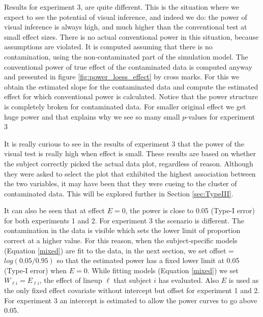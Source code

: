 \documentclass{article}
\begin{document}
Results for experiment 3, are quite different. This is the situation where we expect to see the potential of visual inference, and indeed we do: the power of visual inference is always high, and much higher than the conventional test at small effect sizes. There is no actual conventional power in this situation, because assumptions are violated. It is computed assuming that there is no contamination, using the non-contaminated part of the simulation model. The  conventional power of true effect of the contaminated data is computed anyway and presented in figure \ref{fig:power_loess_effect} by cross marks. For this we obtain the estimated slope for the contaminated data and compute the estimated effect for which conventional power is calculated. Notice that the power structure is completely broken for contaminated data. For smaller original effect we get huge power and that explains why we see so many small $p$-values for experiment 3

It is really curious to see in the results of experiment 3 that the power of the visual test is really high when effect is small. These results are based on whether the subject correctly picked the actual data plot, regardless of reason. Although they were asked to select the plot that exhibited the highest association between the two variables, it may have been that they were cueing to the cluster of contaminated data. This will be explored further in Section \ref{sec:TypeIII}. 


It can also be seen that at effect $E=0$, the power is close to 0.05 (Type-I error) for both experiments 1 and 2. For experiment 3 the scenario is different. The contamination in the data is visible which sets the lower limit of proportion correct at a higher value. For this reason, when the subject-specific models (Equation \ref{mixed}) are fit to the data, in the next section, we set offset = $log(0.05/0.95)$ so that the estimated power has a fixed lower limit at 0.05 (Type-I error) when $E=0$. While fitting models (Equation \ref{mixed}) we set $W_{\ell i} = E_{\ell i}$, the effect of lineup $\ell$ that subject $i$ has evaluated. Also $E$ is used as the only fixed effect covariate without intercept but offset for experiment 1 and 2. For experiment 3 an intercept is estimated to allow the power curves to go above 0.05. 
\end{document}
